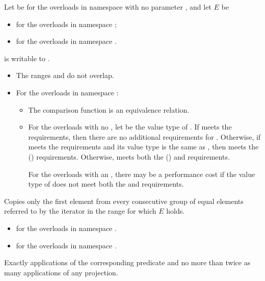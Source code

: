 \begin{itemdescr}
\pnum
Let  be  for the overloads
in namespace  with no parameter , and
let $E$ be
\begin{itemize}
\setlength{\emergencystretch}{1em}
\item
  for the overloads in namespace ;
\item
  for the overloads in namespace .
\end{itemize}

\pnum
\mandates
{} is writable to .

\pnum
\expects
\begin{itemize}
\item
  The ranges  and 
  do not overlap.
\item
  For the overloads in namespace :
  \begin{itemize}
  \item
    The comparison function is an equivalence relation.
  \item
    For the overloads with no ,
    let  be the value type of .
    If  meets
    the  requirements,
    then there are no additional requirements for .
    Otherwise, if  meets
    the  requirements and
    its value type is the same as ,
    then  meets
    the  () requirements.
    Otherwise,  meets both
    the  () and
     requirements.
    \begin{note}
    For the overloads with an ,
    there may be a performance cost
    if the value type of  does not meet both the
     and  requirements.
    \end{note}
  \end{itemize}
\end{itemize}

\pnum
\effects
Copies only the first element from every consecutive group of equal elements
referred to by the iterator  in the range 
for which $E$ holds.

\pnum
\returns
\begin{itemize}
\item {} for the overloads in namespace .
\item {} for the overloads in namespace .
\end{itemize}

\pnum
\complexity
Exactly  applications
of the corresponding predicate
and no more than twice as many applications of any projection.
\end{itemdescr}

